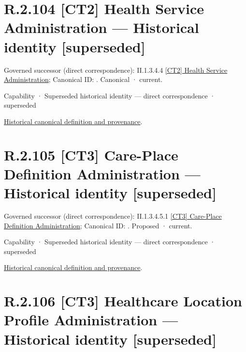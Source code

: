 \section*{R.2.104 [CT2] Health Service Administration — Historical identity [superseded]}
\label{navigation:R.2.104}

{\small Governed successor (direct correspondence): II.1.3.4.4 \hyperref[element:ba68a52913a0499d8377553bddfa74a4]{[CT2] Health Service Administration}; Canonical ID: \texttt{}. Canonical · current.}\par
\label{element:f1ab1258cf2944efb50105e7885f8027}
{\small Capability · Superseded historical identity — direct correspondence · superseded}\par
\href{../../../../../../../continuum/strategy/capability/f1ab1258cf2944efb50105e7885f8027.md}{Historical canonical definition and provenance}.\par
\section*{R.2.105 [CT3] Care-Place Definition Administration — Historical identity [superseded]}
\label{navigation:R.2.105}

{\small Governed successor (direct correspondence): II.1.3.4.5.1 \hyperref[element:629b493c7d9844baa25c029a87ed04f6]{[CT3] Care-Place Definition Administration}; Canonical ID: \texttt{}. Proposed · current.}\par
\label{element:a3464bd9c0dc4a01b50803acc7705b4e}
{\small Capability · Superseded historical identity — direct correspondence · superseded}\par
\href{../../../../../../../continuum/strategy/capability/a3464bd9c0dc4a01b50803acc7705b4e.md}{Historical canonical definition and provenance}.\par
\section*{R.2.106 [CT3] Healthcare Location Profile Administration — Historical identity [superseded]}
\label{navigation:R.2.106}


